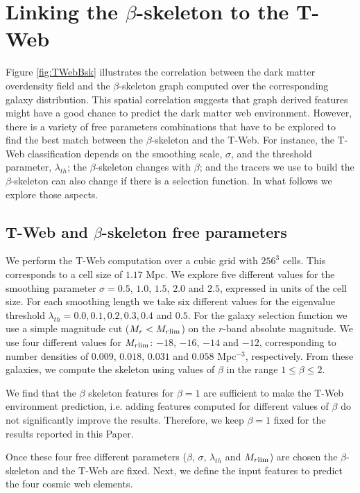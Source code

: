 \documentclass[usenatbib]{mnras}
\begin{document}
\section{Linking the $\beta$-skeleton to the T-Web}\label{sec:link}

Figure \ref{fig:TWebBsk} illustrates the correlation between the dark matter overdensity field and the $\beta$-skeleton graph computed over the corresponding galaxy distribution. 
This spatial correlation suggests that graph derived features might have
a good chance to predict the dark matter web environment. 
However, there is a variety of free parameters combinations that have to be explored to find the best match between the $\beta$-skeleton and the T-Web.
For instance, the T-Web classification depends on the smoothing scale, $\sigma$, and the threshold parameter, $\lambda_{th}$; the $\beta$-skeleton changes with $\beta$; and the tracers we use to build the $\beta$-skeleton can also change if there is a selection function.
In what follows we explore those aspects.


\subsection{T-Web and $\beta$-skeleton free parameters}

We perform the T-Web computation over a cubic grid with $256^3$ cells. 
This corresponds to a cell size of $1.17$ Mpc.
We explore five different values for the smoothing parameter $\sigma =
0.5$, $1.0$, $1.5$, $2.0$ and $2.5$, expressed in units of the cell size.
For each smoothing length we take six different values for
the eigenvalue threshold
$\lambda_{th}=0.0, 0.1, 0.2, 0.3, 0.4$ and $0.5$. 
For the galaxy selection function we use a simple magnitude cut ($M_{r}<M_{r\rm{lim}}$) on the $r$-band absolute magnitude.
We use four different values for $M_{r\rm{lim}}$: $-18$, $-16$, $-14$ and $-12$, corresponding to number densities of $0.009$, $0.018$, $0.031$ and $0.058$ Mpc$^{-3}$, respectively.
From these galaxies, we compute the skeleton using values of $\beta$ in
the range $1\leq \beta \leq 2$.

We find that the $\beta$ skeleton features for $\beta=1$ are sufficient to make the T-Web environment prediction, i.e. adding features computed for different values of $\beta$ do not significantly improve the results.
Therefore, we keep $\beta=1$ fixed for the results reported in this Paper.

Once these four free different parameters ($\beta$,
$\sigma$, $\lambda_{th}$ and $M_{r\rm{lim}}$) are chosen the $\beta$-skeleton and the T-Web are fixed.  
Next, we define the input features to predict the four cosmic web elements.
\end{document}
